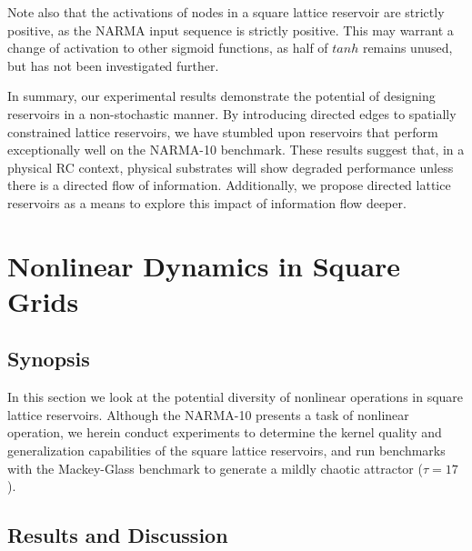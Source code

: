 Note also that the activations of nodes in a square lattice reservoir are
strictly positive, as the NARMA input sequence is strictly positive. This may
warrant a change of activation to other sigmoid functions, as half of $tanh$
remains unused, but has not been investigated further.

In summary, our experimental results demonstrate the potential of designing
reservoirs in a non-stochastic manner. By introducing directed edges to
spatially constrained lattice reservoirs, we have stumbled upon reservoirs that
perform exceptionally well on the NARMA-10 benchmark. These results suggest
that, in a physical RC context, physical substrates will show degraded
performance unless there is a directed flow of information. Additionally, we
propose directed lattice reservoirs as a means to explore this impact of
information flow deeper.

\section{Nonlinear Dynamics in Square Grids}

\subsection{Synopsis}

In this section we look at the potential diversity of nonlinear operations in
square lattice reservoirs. Although the NARMA-10 presents a task of nonlinear
operation, we herein conduct experiments to determine the kernel quality and
generalization capabilities of the square lattice reservoirs, and run benchmarks
with the Mackey-Glass benchmark to generate a mildly chaotic attractor ($\tau =
17$).

\subsection{Results and Discussion}

